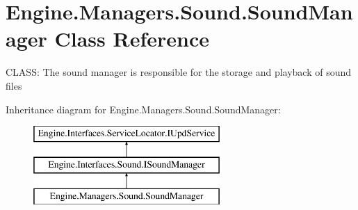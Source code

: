 \hypertarget{a00546}{}\section{Engine.\+Managers.\+Sound.\+Sound\+Manager Class Reference}
\label{a00546}


C\+L\+A\+SS\+: The sound manager is responsible for the storage and playback of sound files  


Inheritance diagram for Engine.\+Managers.\+Sound.\+Sound\+Manager\+:\begin{figure}[H]
\begin{center}
\leavevmode
\includegraphics[height=3.000000cm]{dc/d2b/a00546}
\end{center}
\end{figure}

